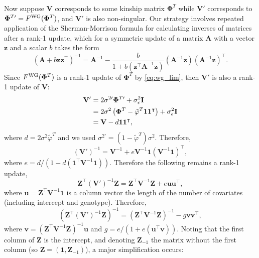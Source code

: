\documentclass[11pt]{article}
\newcommand{\kinMat}[1][T]{%
  \ensuremath{%
    \mathbf{\Phi}^{#1}
  }%
  \xspace%
}%
\newcommand{\kinMatPrime}{%
  \ensuremath{%
    \mathbf{\Phi}^{T\prime}
  }%
  \xspace%
}%
\begin{document}
\begin{appendices}
  Now suppose $\mathbf{V}$ corresponds to some kinship matrix \kinMat while $\mathbf{V}'$ corresponds to $\kinMatPrime = F^\text{WG}(\kinMat)$, and $\mathbf{V}'$ is also non-singular.
  Our strategy involves repeated application of the Sherman-Morrison formula for calculating inverses of matrices after a rank-1 update, which for a symmetric update of a matrix $\mathbf{A}$ with a vector $\mathbf{z}$ and a scalar $b$ takes the form \citep{sherman_adjustment_1950}
  $$
  \left( \mathbf{A} + b \mathbf{z}\mathbf{z}^\intercal \right)^{-1}
  =
  \mathbf{A}^{-1} - \frac{
    b
  }{
    1 + b \left( \mathbf{z}^\intercal \mathbf{A}^{-1} \mathbf{z} \right)
  }
  \left( \mathbf{A}^{-1} \mathbf{z} \right) \left( \mathbf{A}^{-1} \mathbf{z} \right)^\intercal
  .
  $$
  Since $F^\text{WG}(\kinMat)$ is a rank-1 update of \kinMat by \cref{eq:wg_lim}, then $\mathbf{V}'$ is also a rank-1 update of $\mathbf{V}$:
  \begin{align*}
    \mathbf{V}'
    &=
      2 \sigma^{2\prime} \kinMatPrime + \sigma^2_\epsilon \mathbf{I}
      \\
    &=
      2 \sigma^2 \left( \kinMat - \tilde{\varphi}^T \mathbf{1}\mathbf{1}^\intercal \right)
      + \sigma^2_\epsilon \mathbf{I}
      \\
    &=
    \mathbf{V} - d \mathbf{1}\mathbf{1}^\intercal
    ,
  \end{align*}
  where $d = 2 \sigma^2 \tilde{\varphi}^T$ and we used $\sigma^{2\prime} = \left( 1 - \tilde{\varphi}^T \right) \sigma^2$.
  Therefore,
  $$
  \left( \mathbf{V}' \right)^{-1}
  =
  \mathbf{V}^{-1} + e \mathbf{V}^{-1} \mathbf{1} \left( \mathbf{V}^{-1} \mathbf{1} \right)^\intercal
  ,
  $$
  where $e = d / \left( 1 - d \left( \mathbf{1}^\intercal \mathbf{V}^{-1} \mathbf{1} \right) \right)$.
  Therefore the following remains a rank-1 update,
  $$
  \mathbf{Z}^\intercal \left( \mathbf{V}' \right)^{-1} \mathbf{Z}
  =
  \mathbf{Z}^\intercal \mathbf{V}^{-1} \mathbf{Z} + e \mathbf{u} \mathbf{u}^\intercal
  ,
  $$
  where $\mathbf{u} = \mathbf{Z}^\intercal \mathbf{V}^{-1} \mathbf{1}$ is a column vector the length of the number of covariates (including intercept and genotype).
  Therefore, 
  $$
  \left( \mathbf{Z}^\intercal \left( \mathbf{V}' \right)^{-1} \mathbf{Z} \right)^{-1}
  =
  \left( \mathbf{Z}^\intercal \mathbf{V}^{-1} \mathbf{Z} \right)^{-1}
  - g \mathbf{v} \mathbf{v}^\intercal
  ,
  $$
  where $\mathbf{v} = \left( \mathbf{Z}^\intercal \mathbf{V}^{-1} \mathbf{Z} \right)^{-1} \mathbf{u}$
  and $g = e/(1 + e (\mathbf{u}^\intercal \mathbf{v}))$.
  Noting that the first column of $\mathbf{Z}$ is the intercept, and denoting $\mathbf{Z}_{-1}$ the matrix without the first column (so $\mathbf{Z} = (\mathbf{1}, \mathbf{Z}_{-1})$), a major simplification occurs:

\end{appendices}
\end{document}
